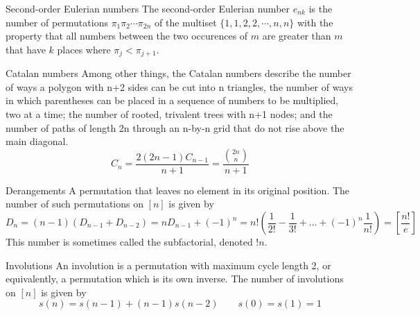 \begin{algorithm}{Second-order Eulerian numbers}
\desc
The second-order Eulerian number $e_{nk}$ is the number of
permutations $\pi_1 \pi_2 \cdots \pi_{2n}$ of the multiset
$\{1,1,2,2,\cdots,n,n\}$ with the property that all numbers between
the two occurences of $m$ are greater than $m$ that have $k$ places
where $\pi_j < \pi_{j+1}$.
\end{algorithm}

\begin{algorithm}{Catalan numbers}
\keyword{}
\desc
Among other things, the Catalan numbers describe the number of ways a polygon
with n+2 sides can be cut into n triangles, the number of ways in which
parentheses can be placed in a sequence of numbers to be multiplied, two at
a time; the number of rooted, trivalent trees with n+1 nodes; and the number
of paths of length 2n through an n-by-n grid that do not rise above the
main diagonal.
$$C_n = \frac{2(2n-1)C_{n-1}}{n+1} = \frac{\binom{2n}{n}}{\scriptstyle n+1}$$
\end{algorithm}

\begin{algorithm}{Derangements}
\keyword{}
\desc
A permutation that leaves no element in its original position.  The
number of such permutations on $[n]$ is given by
$$D_n = (n-1)(D_{n-1}+D_{n-2}) = nD_{n-1} + (-1)^n = n!\left(\frac
1{2!}-\frac 1{3!}+\ldots+(-1)^n\frac 1{n!}\right) =
\left[\frac{n!}{e}\right]$$
This number is sometimes called the subfactorial, denoted $!n$.
\end{algorithm}

\begin{algorithm}{Involutions}
\keyword{}
\desc
An involution is a permutation with maximum cycle length 2, or
equivalently, a permutation which is its own inverse.  The number of
involutions on $[n]$ is given by
$$s(n) = s(n-1) + (n-1)s(n-2) \qquad s(0) = s(1) = 1$$
\end{algorithm}

